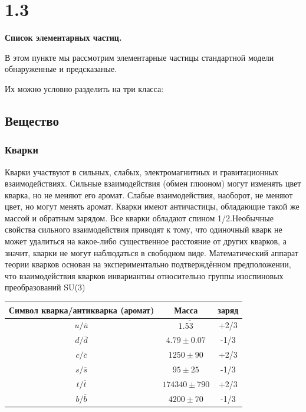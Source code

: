 \documentclass[a4paper,14pt]{article}
\begin{document}
\tableofcontents
\newpage

\section*{1.3}
\begin{center}
	\LARGE{\textbf{Список элементарных частиц.}}
\end{center}


В этом пункте мы рассмотрим элементарные частицы стандартной модели обнаруженные и предсказаные.

Их можно условно разделить на три класса:

\subsection*{Вещество}

\subsubsection*{Кварки}

Кварки участвуют в сильных, слабых, электромагнитных и гравитационных взаимодействиях. Сильные взаимодействия (обмен глюоном) могут изменять цвет кварка, но не меняют его аромат. Слабые взаимодействия, наоборот, не меняют цвет, но могут менять аромат. Кварки имеют античастицы, обладающие такой же массой и обратным зарядом. Все кварки обладают спином 1/2.Необычные свойства сильного взаимодействия приводят к тому, что одиночный кварк не может удалиться на какое-либо существенное расстояние от других кварков, а значит, кварки не могут наблюдаться в свободном виде. Математический аппарат теории кварков основан на экспериментально подтверждённом предположении, что взаимодействия кварков инвариантны относительно группы изоспиновых преобразований SU(3)

\begin{center}
\begin{tabular}{|c|c|c|}
\hline
Символ кварка/антикварка (аромат)&Масса&заряд\\
\hline
$u/\overline{u}$&$1.5 \tilde 3$&+2/3\\
\hline
$d/\overline{d}$&$4.79 \pm 0.07$&-1/3\\
\hline
$c/\overline{c}$&$1250 \pm 90$&+2/3\\
\hline
$s/\overline{s}$&$95 \pm 25$&-1/3\\
\hline
$t/\overline{t}$&$174340 \pm 790$&+2/3\\
\hline
$b/\overline{b}$&$4200 \pm 70$&-1/3\\
\hline
\end{tabular}
\end{center}
\end{document}
